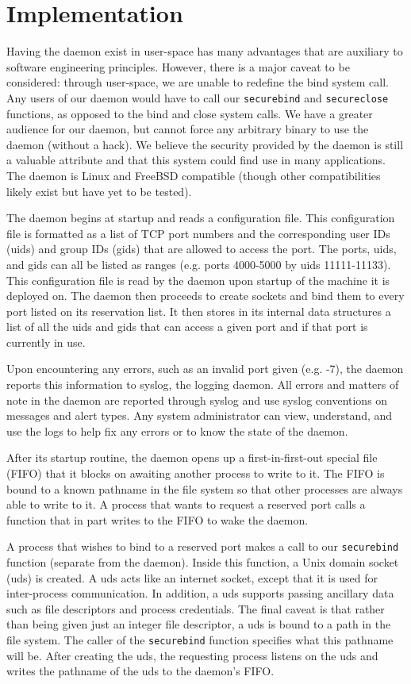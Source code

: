 \documentclass{sig-alternate}
\begin{document}
\section{Implementation}
Having the daemon exist in user-space has many advantages that are auxiliary to software engineering principles. However, there is a major caveat to be considered: through user-space, we are unable to redefine the bind system call. Any users of our daemon would have to call our \texttt{secure\textunderscore bind} and \texttt{secure\textunderscore close} functions, as opposed to the bind and close system calls. We have a greater audience for our daemon, but cannot force any arbitrary binary to use the daemon (without a hack). We believe the security provided by the daemon is still a valuable attribute and that this system could find use in many applications. The daemon is Linux and FreeBSD compatible (though other compatibilities likely exist but have yet to be tested). 

	The daemon begins at startup and reads a configuration file. This configuration file is formatted as a list of TCP port numbers and the corresponding user IDs (uids) and group IDs (gids) that are allowed to access the port. The ports, uids, and gids can all be listed as ranges (e.g. ports 4000-5000 by uids 11111-11133). This configuration file is read by the daemon upon startup of the machine it is deployed on. The daemon then proceeds to create sockets and bind them to every port listed on its reservation list. It then stores in its internal data structures a list of all the uids and gids that can access a given port and if that port is currently in use.
	
	Upon encountering any errors, such as an invalid port given (e.g. -7), the daemon reports this information to syslog, the logging daemon. All errors and matters of note in the daemon are reported through syslog and use syslog conventions on messages and alert types. Any system administrator can view, understand, and use the logs to help fix any errors or to know the state of the daemon.
	
	After its startup routine, the daemon opens up a first-in-first-out special file (FIFO) that it blocks on awaiting another process to write to it. The FIFO is bound to a known pathname in the file system so that other processes are always able to write to it. A process that wants to request a reserved port calls a function that in part writes to the FIFO to wake the daemon.
	
	A process that wishes to bind to a reserved port makes a call to our \texttt{secure\textunderscore bind} function (separate from the daemon). Inside this function, a Unix domain socket (uds) is created. A uds acts like an internet socket, except that it is used for inter-process communication. In addition, a uds supports passing ancillary data such as file descriptors and process credentials. The final caveat is that rather than being given just an integer file descriptor, a uds is bound to a path in the file system. The caller of the \texttt{secure\textunderscore bind} function specifies what this pathname will be. After creating the uds, the requesting process listens on the uds and writes the pathname of the uds to the daemon's FIFO.
	
\end{document}
